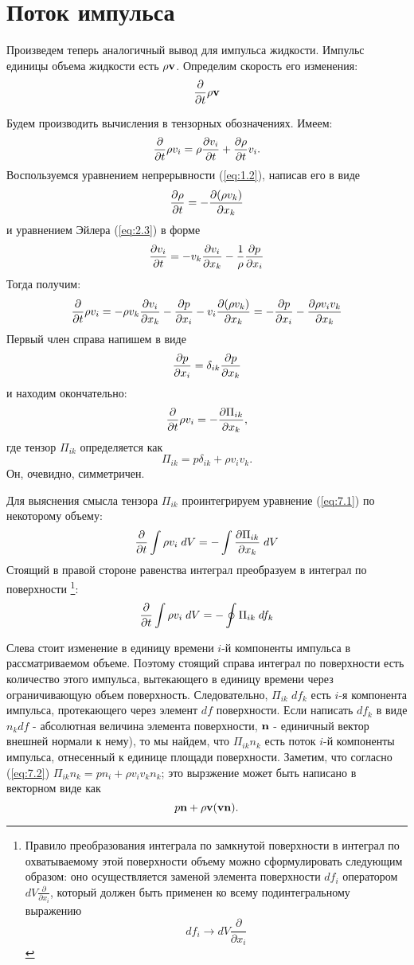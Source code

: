 \section{Поток импульса}
\label{sec:p7}

Произведем теперь аналогичный вывод для импульса жидкости. Импульс единицы
объема жидкости есть $\rho { \mathbf{v} }$. Определим скорость его изменения:
\[
   \frac{\partial}{\partial t} \rho { \mathbf{v} }
\]

Будем  производить вычисления  в тензорных обозначениях. Имеем:
\[
   \frac{\partial}{\partial t} \rho v_i = \rho \frac{\partial{v_i}}{\partial{t}} + \frac{\partial{\rho}}{\partial{t}} v_i .
\]
Воспользуемся  уравнением   непрерывности   (\ref{eq:1.2}),   написав  его в виде
\[
   \frac{\partial{\rho}}{\partial{t}} = - \frac{\partial{(\rho v_k)}}{\partial{x_k}}
\]
и уравнением Эйлера (\ref{eq:2.3}) в форме
\[
   \frac{\partial{v_i}}{\partial{t}} = -v_k \frac{\partial{v_i}}{\partial{x_k}} - \frac1{\rho}\frac{\partial{p}}{\partial{x_i}}
\]
Тогда получим:
\[
   \frac{\partial}{\partial t} \rho v_i = - \rho v_k \frac{\partial{v_i}}{\partial{x_k}} - \frac{\partial{p}}{\partial{x_i}}
    -  v_i \frac{\partial{(\rho v_k)}}{\partial{x_k}} = - \frac{\partial{p}}{\partial{x_i}} - \frac{\partial{\rho v_i v_k}}{\partial{x_k}}
\]
Первый член справа напишем в виде
\[
   \frac{\partial{p}}{\partial{x_i}} = \delta_{ik}\frac{\partial{p}}{\partial{x_k}}
\]
и находим окончательно:
\begin{equation}
   \label{eq:7.1}
   \frac{\partial}{\partial t} \rho v_i = - \frac{\partial{\Pi_{ik}}}{\partial{x_k}},
\end{equation}
где тензор $\Pi_{ik}$ определяется как
\begin{equation}
   \label{eq:7.2}
   \Pi_{ik} = p \delta_{ik} + \rho v_i v_k .
\end{equation}
Он, очевидно, симметричен.

Для выяснения смысла тензора $\Pi_{ik}$ проинтегрируем уравнение (\ref{eq:7.1}) по
некоторому объему:
\[
   \frac{\partial}{\partial t} \int{\rho v_i\; dV} = - \int{\frac{\partial{\Pi_{ik}}}{\partial{x_k}}\; dV}
\]
Стоящий в правой стороне равенства интеграл преобразуем в интеграл по
поверхности \footnote{Правило преобразования интеграла по замкнутой поверхности
в интеграл по охватываемому этой поверхности объему можно сформулировать следующим
образом: оно осуществляется заменой элемента поверхности $df_i$ оператором $dV \frac{\partial}{\partial x_i}$, который должен быть применен ко всему подинтегральному выражению
\[
    df_i \rightarrow dV \frac{\partial}{\partial x_i}
\]
}:
\begin{equation}
   \label{eq:7.3}
   \frac{\partial}{\partial t} \int{\rho v_i\; dV} = - \oint{\Pi_{ik}\; df_k}
\end{equation}

Слева стоит изменение в единицу времени $i$-й компоненты импульса в
рассматриваемом объеме. Поэтому стоящий справа интеграл по поверхности есть
количество этого импульса, вытекающего в единицу времени через ограничивающую
объем поверхность. Следовательно, $\Pi_{ik}\; df_k$ есть $i$-я компонента
импульса, протекающего через элемент $df$ поверхности. Если написать $df_k$ в
виде $n_k df$ - абсолютная величина элемента поверхности, $\mathbf{n}$ - единичный
вектор внешней нормали к нему), то мы найдем, что $\Pi_{ik}n_k$ есть поток $i$-й
компоненты импульса, отнесенный к единице площади поверхности. Заметим, что
согласно (\ref{eq:7.2}) $\Pi_{ik}n_k = pn_i + \rho v_i v_k n_k$; это вырзжение может быть
написано в векторном виде как
\begin{equation}
   \label{eq:7.4}
   p \mathbf{n} + \rho \mathbf{v} (\mathbf{vn}).
\end{equation}

